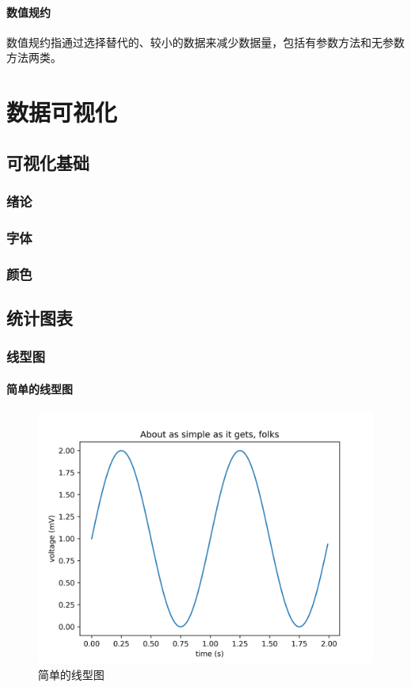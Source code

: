 \documentclass[openany]{progbookcn}
\begin{document}
\subsection{数值规约}
\indent 数值规约指通过选择替代的、较小的数据来减少数据量，包括有参数方法和无参数方法两类。
\part{数据可视化}
\chapter{可视化基础}
\section{绪论}
\section{字体}
\section{颜色}
\chapter{统计图表}
\section{线型图}
\subsection{简单的线型图}

\begin{figure}[H]
\centering
\includegraphics[width=0.6 \textwidth]{figs/chapter24/lines/SimpleLine}
\caption{简单的线型图}
\end{figure}
\end{document}
